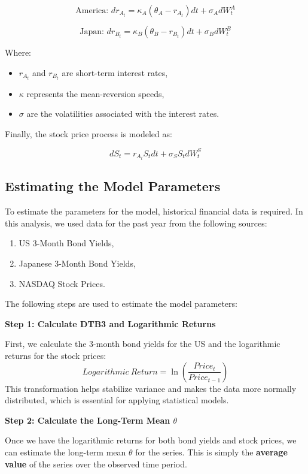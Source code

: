 \documentclass[a4paper, twocolumn]{article}
\begin{document}
\[
\text{America: } dr_{A_t} = \kappa_A(\theta_A - r_{A_t})dt + \sigma_A dW^A_t
\]

\[
\text{Japan: } dr_{B_t} = \kappa_B(\theta_B - r_{B_t})dt + \sigma_B dW^B_t
\]

Where:

\begin{itemize}
    \item $r_{A_t}$ and $r_{B_t}$ are short-term interest rates,
    \item $\kappa$ represents the mean-reversion speeds,
    \item $\sigma$ are the volatilities associated with the interest rates.
\end{itemize}

Finally, the stock price process is modeled as:

\[
dS_t = r_{A_t}S_tdt + \sigma_S S_t dW^S_t
\]

\subsection{Estimating the Model Parameters}

To estimate the parameters for the model, historical financial data is required. In this analysis, we used data for the past year from the following sources: 

\begin{enumerate}

    \item US 3-Month Bond Yields,
    \item Japanese 3-Month Bond Yields,
    \item NASDAQ Stock Prices.
    
\end{enumerate}

The following steps are used to estimate the model parameters:

\textbf{Step 1: Calculate DTB3 and Logarithmic Returns}

First, we calculate the 3-month bond yields for the US and the logarithmic returns for the stock prices:
\[
Logarithmic \: Return = \ln\left(\frac{Price_t}{Price_{t-1}}\right)
\]
This transformation helps stabilize variance and makes the data more normally distributed, which is essential for applying statistical models.

\textbf{Step 2: Calculate the Long-Term Mean $\theta$}

Once we have the logarithmic returns for both bond yields and stock prices, we can estimate the long-term mean $\theta$ for the series. This is simply the \textbf{average value} of the series over the observed time period.
\end{document}
